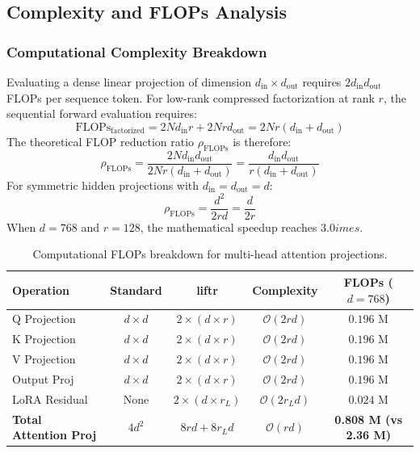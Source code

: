 \subsection{Complexity and FLOPs Analysis}
\subsubsection{Computational Complexity Breakdown}
Evaluating a dense linear projection of dimension $d_{\text{in}} \times d_{\text{out}}$ requires $2 d_{\text{in}} d_{\text{out}}$ FLOPs per sequence token. For low-rank compressed factorization at rank $r$, the sequential forward evaluation requires:
\[
\text{FLOPs}_{\text{factorized}} = 2 N d_{\text{in}} r + 2 N r d_{\text{out}} = 2 N r (d_{\text{in}} + d_{\text{out}})
\]
The theoretical FLOP reduction ratio $\rho_{\text{FLOPs}}$ is therefore:
\[
\rho_{\text{FLOPs}} = \frac{2 N d_{\text{in}} d_{\text{out}}}{2 N r (d_{\text{in}} + d_{\text{out}})} = \frac{d_{\text{in}} d_{\text{out}}}{r (d_{\text{in}} + d_{\text{out}})}
\]
For symmetric hidden projections with $d_{\text{in}} = d_{\text{out}} = d$:
\[
\rho_{\text{FLOPs}} = \frac{d^2}{2 r d} = \frac{d}{2 r}
\]
When $d = 768$ and $r = 128$, the mathematical speedup reaches $3.0	imes$.

\begin{table}[H]
\centering
\small
\begin{tabular}{lcccc}
\toprule
\textbf{Operation} & \textbf{Standard} & \textbf{liftr} & \textbf{Complexity} & \textbf{FLOPs ($d=768$)} \\
\midrule
Q Projection & $d \times d$ & $2 \times (d \times r)$ & $\mathcal{O}(2rd)$ & $0.196$ M \\
K Projection & $d \times d$ & $2 \times (d \times r)$ & $\mathcal{O}(2rd)$ & $0.196$ M \\
V Projection & $d \times d$ & $2 \times (d \times r)$ & $\mathcal{O}(2rd)$ & $0.196$ M \\
Output Proj & $d \times d$ & $2 \times (d \times r)$ & $\mathcal{O}(2rd)$ & $0.196$ M \\
LoRA Residual & None & $2 \times (d \times r_L)$ & $\mathcal{O}(2r_L d)$ & $0.024$ M \\
\midrule
\textbf{Total Attention Proj} & $4 d^2$ & $8rd + 8r_L d$ & $\mathcal{O}(rd)$ & \textbf{0.808 M (vs 2.36 M)} \\
\bottomrule
\end{tabular}
\caption{Computational FLOPs breakdown for multi-head attention projections.}
\end{table}

